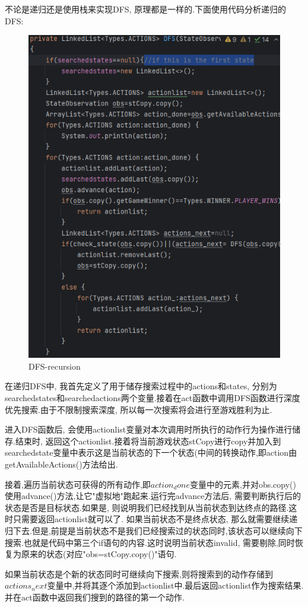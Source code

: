 \documentclass{article}
\begin{document}
不论是递归还是使用栈来实现DFS, 原理都是一样的.下面使用代码分析递归的DFS:

\newpage
\begin{figure}
\centering
\includegraphics[width=0.6\linewidth]{DFS-recursion}
\caption{DFS-recursion}
\end{figure}

在递归DFS中, 我首先定义了用于储存搜索过程中的actions和states, 分别为searchedstates和searchedactions两个变量.接着在act函数中调用DFS函数进行深度优先搜索.由于不限制搜索深度, 所以每一次搜索将会进行至游戏胜利为止.

进入DFS函数后, 会使用actionlist变量对本次调用时所执行的动作行为操作进行储存.结束时, 返回这个actionlist.接着将当前游戏状态stCopy进行copy并加入到searchedstate变量中表示这是当前状态的下一个状态(中间的转换动作,即action由getAvailableActions()方法给出. 

接着,遍历当前状态可获得的所有动作,即$action_done$变量中的元素,并对obs.copy()使用advance()方法,让它"虚拟地"跑起来.运行完advance方法后, 需要判断执行后的状态是否是目标状态.如果是, 则说明我们已经找到从当前状态到达终点的路径.这时只需要返回actionlist就可以了. 如果当前状态不是终点状态, 那么就需要继续递归下去.但是,前提是当前状态不是我们已经搜索过的状态同时,该状态可以继续向下搜索.也就是代码中第三个if语句的内容.这时说明当前状态invalid, 需要剔除,同时恢复为原来的状态(对应"obs=stCopy.copy()"语句.

如果当前状态是个新的状态同时可继续向下搜索,则将搜索到的动作存储到$actions_next$变量中,并将其逐个添加到actionlist中.最后返回actionlist作为搜索结果.并在act函数中返回我们搜到的路径的第一个动作.
\end{document}
